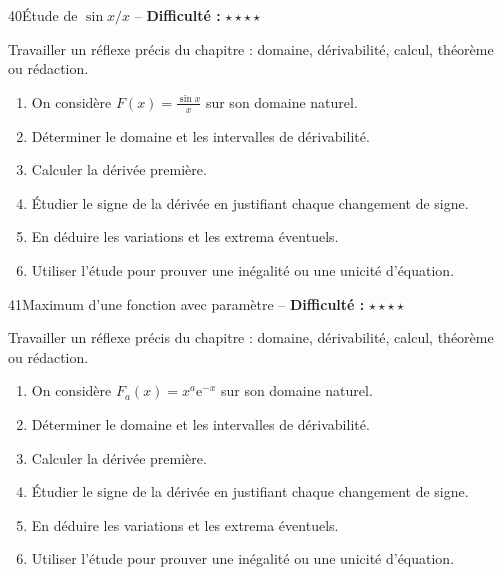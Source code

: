 \documentclass[11pt,a4paper]{article}
\newcommand{\e}{\mathrm{e}}
\newcommand{\etoiles}[1]{\textbf{Difficulté :} #1}
\begin{document}
\begin{exobox}{40}{Étude de $\sin x/x$ -- \etoiles{$\star\star\star\star$}}

\begin{objectifbox}
Travailler un réflexe précis du chapitre : domaine, dérivabilité, calcul, théorème ou rédaction.
\end{objectifbox}

\begin{enumerate}

\item On considère $F(x)=\frac{\sin x}{x}$ sur son domaine naturel.

\item Déterminer le domaine et les intervalles de dérivabilité.

\item Calculer la dérivée première.

\item Étudier le signe de la dérivée en justifiant chaque changement de signe.

\item En déduire les variations et les extrema éventuels.

\item Utiliser l'étude pour prouver une inégalité ou une unicité d'équation.

\end{enumerate}

\end{exobox}


\begin{exobox}{41}{Maximum d'une fonction avec paramètre -- \etoiles{$\star\star\star\star$}}

\begin{objectifbox}
Travailler un réflexe précis du chapitre : domaine, dérivabilité, calcul, théorème ou rédaction.
\end{objectifbox}

\begin{enumerate}

\item On considère $F_a(x)=x^a\e^{-x}$ sur son domaine naturel.

\item Déterminer le domaine et les intervalles de dérivabilité.

\item Calculer la dérivée première.

\item Étudier le signe de la dérivée en justifiant chaque changement de signe.

\item En déduire les variations et les extrema éventuels.

\item Utiliser l'étude pour prouver une inégalité ou une unicité d'équation.

\end{enumerate}

\end{exobox}
\end{document}
